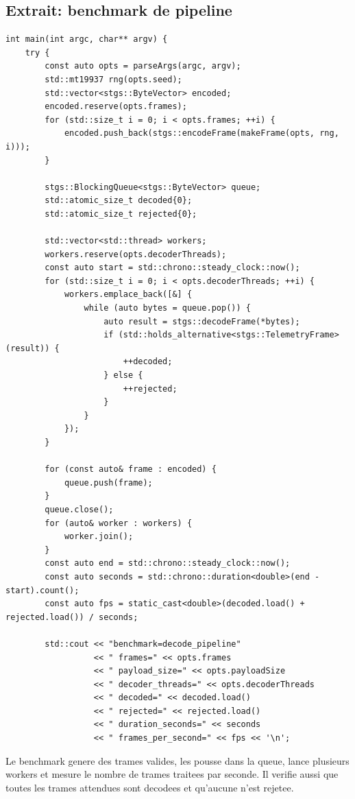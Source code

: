 \documentclass[10pt,a4paper]{article}
\begin{document}
\subsection{Extrait: benchmark de pipeline}
\begin{lstlisting}[caption={Benchmark decode pipeline}]
int main(int argc, char** argv) {
    try {
        const auto opts = parseArgs(argc, argv);
        std::mt19937 rng(opts.seed);
        std::vector<stgs::ByteVector> encoded;
        encoded.reserve(opts.frames);
        for (std::size_t i = 0; i < opts.frames; ++i) {
            encoded.push_back(stgs::encodeFrame(makeFrame(opts, rng, i)));
        }

        stgs::BlockingQueue<stgs::ByteVector> queue;
        std::atomic_size_t decoded{0};
        std::atomic_size_t rejected{0};

        std::vector<std::thread> workers;
        workers.reserve(opts.decoderThreads);
        const auto start = std::chrono::steady_clock::now();
        for (std::size_t i = 0; i < opts.decoderThreads; ++i) {
            workers.emplace_back([&] {
                while (auto bytes = queue.pop()) {
                    auto result = stgs::decodeFrame(*bytes);
                    if (std::holds_alternative<stgs::TelemetryFrame>(result)) {
                        ++decoded;
                    } else {
                        ++rejected;
                    }
                }
            });
        }

        for (const auto& frame : encoded) {
            queue.push(frame);
        }
        queue.close();
        for (auto& worker : workers) {
            worker.join();
        }
        const auto end = std::chrono::steady_clock::now();
        const auto seconds = std::chrono::duration<double>(end - start).count();
        const auto fps = static_cast<double>(decoded.load() + rejected.load()) / seconds;

        std::cout << "benchmark=decode_pipeline"
                  << " frames=" << opts.frames
                  << " payload_size=" << opts.payloadSize
                  << " decoder_threads=" << opts.decoderThreads
                  << " decoded=" << decoded.load()
                  << " rejected=" << rejected.load()
                  << " duration_seconds=" << seconds
                  << " frames_per_second=" << fps << '\n';

\end{lstlisting}


Le benchmark genere des trames valides, les pousse dans la queue, lance plusieurs workers et mesure le nombre de trames traitees par seconde. Il verifie aussi que toutes les trames attendues sont decodees et qu'aucune n'est rejetee.
\end{document}

